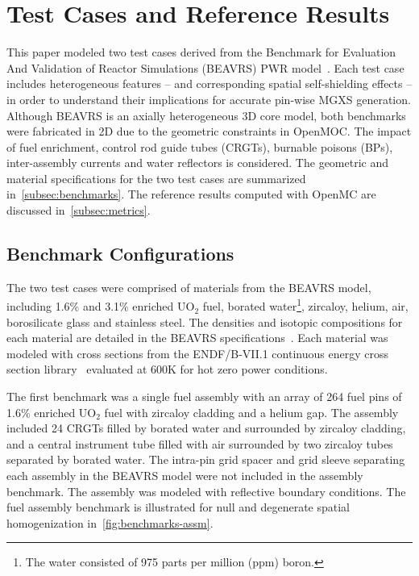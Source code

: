 \section{Test Cases and Reference Results}
\label{sec:test-cases}

This paper modeled two test cases derived from the Benchmark for Evaluation And Validation of Reactor Simulations (BEAVRS) PWR model~\citep{horelik2013beavrs}. Each test case includes heterogeneous features -- and corresponding spatial self-shielding effects -- in order to understand their implications for accurate pin-wise MGXS generation. Although BEAVRS is an axially heterogeneous 3D core model, both benchmarks were fabricated in 2D due to the geometric constraints in OpenMOC. The impact of fuel enrichment, control rod guide tubes (CRGTs), burnable poisons (BPs), inter-assembly currents and water reflectors is considered. The geometric and material specifications for the two test cases are summarized in~\autoref{subsec:benchmarks}. The reference results computed with OpenMC are discussed in~\autoref{subsec:metrics}.


\subsection{Benchmark Configurations}
\label{subsec:benchmarks}

The two test cases were comprised of materials from the BEAVRS model, including 1.6\% and 3.1\% enriched UO$_2$ fuel, borated water\footnote{The water consisted of 975 parts per million (ppm) boron.}, zircaloy, helium, air, borosilicate glass and stainless steel. The densities and isotopic compositions for each material are detailed in the BEAVRS specifications~\citep{horelik2013beavrs}. Each material was modeled with cross sections from the ENDF/B-VII.1 continuous energy cross section library~\citep{mcnpx2003manual} evaluated at 600K for hot zero power conditions.

The first benchmark was a single fuel assembly with an array of 264 fuel pins of 1.6\% enriched UO$_2$ fuel with zircaloy cladding and a helium gap. The assembly included 24 CRGTs filled by borated water and surrounded by zircaloy cladding, and a central instrument tube filled with air surrounded by two zircaloy tubes separated by borated water. The intra-pin grid spacer and grid sleeve separating each assembly in the BEAVRS model were not included in the assembly benchmark. The assembly was modeled with reflective boundary conditions. The fuel assembly benchmark is illustrated for null and degenerate spatial homogenization in~\autoref{fig:benchmarks-assm}.

